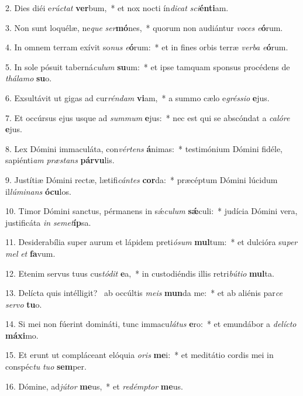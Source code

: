 2. Dies diéi e\textit{rúc}\textit{tat} \textbf{ver}bum,~*  et nox nocti ín\textit{di}\textit{cat} \textit{sci}\textbf{én}\textbf{ti}am.\

3. Non sunt loquélæ, ne\textit{que} \textit{ser}\textbf{mó}nes,~*  quorum non audiántur \textit{vo}\textit{ces} \textit{e}\textbf{ó}rum.\

4. In omnem terram exívit so\textit{nus} \textit{e}\textbf{ó}rum:~*  et in fines orbis terræ \textit{ver}\textit{ba} \textit{e}\textbf{ó}rum.\

5. In sole pósuit taberná\textit{cu}\textit{lum} \textbf{su}um:~*  et ipse tamquam sponsus procédens de \textit{thá}\textit{la}\textit{mo} \textbf{su}o.\

6. Exsultávit ut gigas ad cur\textit{rén}\textit{dam} \textbf{vi}am,~*  a summo cælo e\textit{grés}\textit{si}\textit{o} \textbf{e}jus.\

7. Et occúrsus ejus usque ad \textit{sum}\textit{mum} \textbf{e}jus:~*  nec est qui se abscóndat a \textit{ca}\textit{ló}\textit{re} \textbf{e}jus.\

8. Lex Dómini immaculáta, con\textit{vér}\textit{tens} \textbf{á}nimas:~*  testimónium Dómini fidéle, sapiénti\textit{am} \textit{præ}\textit{stans} \textbf{pár}\textbf{vu}lis.\

9. Justítiæ Dómini rectæ, lætifi\textit{cán}\textit{tes} \textbf{cor}da:~*  præcéptum Dómini lúcidum il\textit{lú}\textit{mi}\textit{nans} \textbf{ó}\textbf{cu}los.\

10. Timor Dómini sanctus, pérmanens in sǽ\textit{cu}\textit{lum} \textbf{sǽ}culi:~*  judícia Dómini vera, justificáta \textit{in} \textit{se}\textit{met}\textbf{íp}sa.\

11. Desiderabília super aurum et lápidem preti\textit{ó}\textit{sum} \textbf{mul}tum:~*  et dulcióra su\textit{per} \textit{mel} \textit{et} \textbf{fa}vum.\

12. Etenim servus tuus cus\textit{tó}\textit{dit} \textbf{e}a,~*  in custodiéndis illis retri\textit{bú}\textit{ti}\textit{o} \textbf{mul}ta.\

13. Delícta quis intélligit? \dag\  ab occúltis \textit{me}\textit{is} \textbf{mun}da me:~*  et ab aliénis par\textit{ce} \textit{ser}\textit{vo} \textbf{tu}o.\

14. Si mei non fúerint domináti, tunc immacu\textit{lá}\textit{tus} \textbf{e}ro:~*  et emundábor a \textit{de}\textit{líc}\textit{to} \textbf{má}\textbf{xi}mo.\

15. Et erunt ut compláceant elóquia \textit{o}\textit{ris} \textbf{me}i:~*  et meditátio cordis mei in conspéc\textit{tu} \textit{tu}\textit{o} \textbf{sem}per.\

16. Dómine, ad\textit{jú}\textit{tor} \textbf{me}us,~*  et \textit{red}\textit{émp}\textit{tor} \textbf{me}us.\

